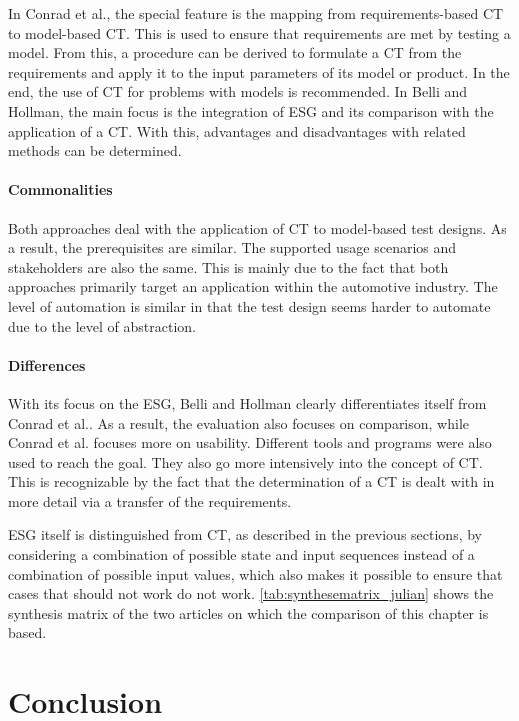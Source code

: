 In Conrad et al.\cite{Conrad2005}, the special feature is the mapping from requirements-based CT to model-based CT. This is used to ensure that requirements are met by testing a model. From this, a procedure can be derived to formulate a CT from the requirements and apply it to the input parameters of its model or product. In the end, the use of CT for problems with models is recommended. In Belli and Hollman\cite{Belli2009}, the main focus is the integration of ESG and its comparison with the application of a CT. With this, advantages and disadvantages with related methods can be determined.

\paragraph{Commonalities}

Both approaches deal with the application of CT to model-based test designs. As a result, the prerequisites are similar. The supported usage scenarios and stakeholders are also the same. This is mainly due to the fact that both approaches primarily target an application within the automotive industry. The level of automation is similar in that the test design seems harder to automate due to the level of abstraction.

\paragraph{Differences}

With its focus on the ESG, Belli and Hollman\cite{Belli2009} clearly differentiates itself from Conrad et al.\cite{Conrad2005}. As a result, the evaluation also focuses on comparison, while Conrad et al.\cite{Conrad2005} focuses more on usability. Different tools and programs were also used to reach the goal. They also go more intensively into the concept of CT. This is recognizable by the fact that the determination of a CT is dealt with in more detail via a transfer of the requirements.

ESG itself is distinguished from CT, as described in the previous sections, by considering a combination of possible state and input sequences instead of a combination of possible input values, which also makes it possible to ensure that cases that should not work do not work. \autoref{tab:synthesematrix_julian} shows the synthesis matrix of the two articles on which the comparison of this chapter is based. 

\section{Conclusion}
\label{Kap:Conclusion}

